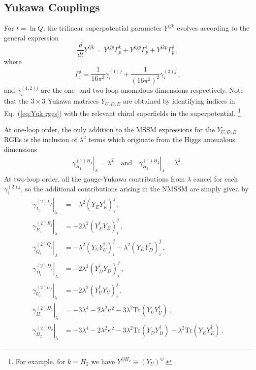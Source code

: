 \documentclass[final,3p,times,pdflatex]{elsarticle}
\newcommand{\lamsq}{\lambda^2}
\newcommand{\kapsq}{\kappa^2}
\newcommand{\tr}{\mathrm{Tr}}
\newcommand{\dt}{\frac{d}{dt}}
\begin{document}
\subsection{Yukawa Couplings}
For $t = \ln Q$, the trilinear superpotential parameter $Y^{ijk}$ evolves 
according to the general expression \cite{MV94}
%
\begin{equation}
\dt Y^{ijk} = Y^{ijp}\Gamma_p^k + Y^{kjp}\Gamma_p^i + Y^{ikp}\Gamma_p^j\,,
\label{eq:Yuk rges}
\end{equation}
%
where 
%
\begin{equation}
\Gamma_i^j = \frac{1}{16\pi^2}\gamma_i^{(1)j} 
+ \frac{1}{(16\pi^2)^2}\gamma_{i}^{(2)j}\,, 
\end{equation}
%
and $\gamma^{(1,2)j}_i$ are the one- and two-loop anomalous dimensions 
respectively.  Note that the $3\times 3$ Yukawa matrices $Y_{U,D,E}$ are 
obtained by identifying indices in Eq.~(\ref{eq:Yuk rges}) with the relevant chiral superfields in the superpotential.%
\footnote{For example, for $k=H_2$ we have $Y^{ijH_2}\equiv (Y_U)^{ij}$.}  

At one-loop order, the only addition to the MSSM expressions 
\cite{MV94} for the $Y_{U,D,E}$ RGEs is the inclusion of $\lamsq$ terms 
which originate from the Higgs anomalous dimensions
%
\begin{align}
\left.\gamma^{(1) H_1}_{H_1}\right|_\lambda = \lamsq 
\quad \mbox{and} \quad \left.\gamma^{(1) H_2}_{H_2} \right|_\lambda = \lamsq\,.
\end{align}
%
At two-loop order, all the gauge-Yukawa contributions from $\lambda$ cancel for 
each $\gamma_i^{(2)j}$, so the additional contributions arising in the NMSSM are 
simply given by
%
\begin{align}
\left.\gamma_{L_i}^{(2)L_j}\right|_\lambda &= -\lamsq (Y_E Y_E^\dagger)_i^j\,, \\
%
\left.\gamma_{E_i}^{(2)E_j}\right|_\lambda &= -2\lamsq (Y_E^\dagger Y_E)_i^j\,, \\
%
\left.\gamma_{Q_i}^{(2)Q_j}\right|_\lambda &= -\lamsq (Y_U Y_U^\dagger)_i^j 
- \lamsq (Y_D Y_D^\dagger)_i^j\,, \\
%
\left.\gamma_{D_i}^{(2)D_j}\right|_\lambda &= -2\lamsq (Y_D^\dagger Y_D)_i^j\,, \\
%
\left.\gamma_{U_i}^{(2)U_j}\right|_\lambda &= -2\lamsq (Y_U^\dagger Y_U)_i^j \,, \\
%
\left.\gamma_{H_1}^{(2)H_1}\right|_\lambda &= -3\lambda^4 -2\lamsq\kapsq 
- 3\lamsq \tr(Y_U Y_U^\dagger)\,, \\
%
\left.\gamma_{H_2}^{(2)H_2}\right|_\lambda &= -3\lambda^4 -2\lamsq\kapsq 
- 3\lamsq \tr(Y_D Y_D^\dagger) - \lamsq \tr(Y_E Y_E^\dagger)\,.
\end{align}
%
\end{document}
